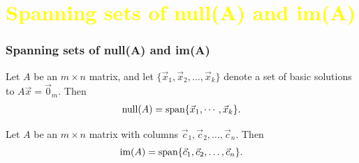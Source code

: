 \documentclass[pdf,9pt]{beamer}
\begin{document}
\section[\textcolor{yellow}{}]{\textcolor{yellow}{Spanning sets of null(A) and im(A)}}
\begin{frame}[fragile]
\frametitle{Spanning sets of null(A) and im(A)}
\pause
\begin{lemma}
    Let $A$ be an $m\times n$ matrix, and let $\{ \vec{x}_1, \vec{x}_2, \ldots, \vec{x}_k\}$
    denote a set of basic solutions to $A\vec{x}=\vec{0}_m$.
    Then
    \begin{align*}
	\mbox{null}(A) = \mbox{span}\{\vec{x}_1,\cdots,\vec{x}_k\}.
    \end{align*}
\end{lemma}
\vfill
\begin{lemma}
    Let $A$ be an $m\times n$ matrix with columns
    $\vec{c}_1, \vec{c}_2, \ldots, \vec{c}_n$. Then
    \[ \mbox{im}(A) = \mbox{span}\{ \vec{c}_1, \vec{c}_2, \ldots, \vec{c}_n\}.\]
\end{lemma}
\end{frame}
\end{document}
